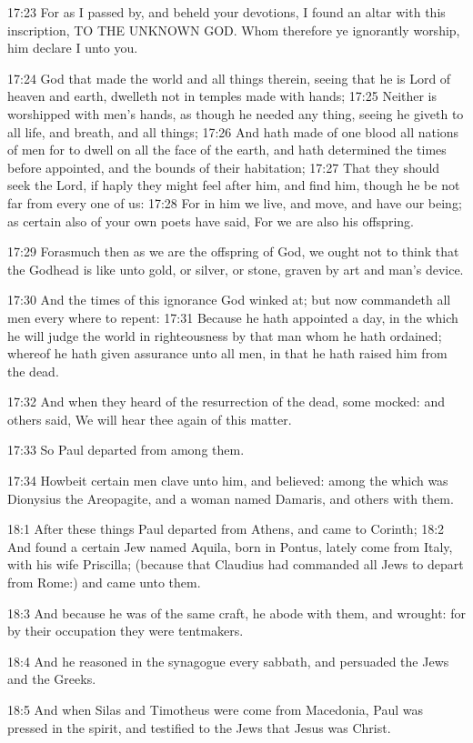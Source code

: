 17:23 For as I passed by, and beheld your devotions, I found an altar
with this inscription, TO THE UNKNOWN GOD. Whom therefore ye
ignorantly worship, him declare I unto you.

17:24 God that made the world and all things therein, seeing that he
is Lord of heaven and earth, dwelleth not in temples made with hands;
17:25 Neither is worshipped with men's hands, as though he needed any
thing, seeing he giveth to all life, and breath, and all things; 17:26
And hath made of one blood all nations of men for to dwell on all the
face of the earth, and hath determined the times before appointed, and
the bounds of their habitation; 17:27 That they should seek the Lord,
if haply they might feel after him, and find him, though he be not far
from every one of us: 17:28 For in him we live, and move, and have our
being; as certain also of your own poets have said, For we are also
his offspring.

17:29 Forasmuch then as we are the offspring of God, we ought not to
think that the Godhead is like unto gold, or silver, or stone, graven
by art and man's device.

17:30 And the times of this ignorance God winked at; but now
commandeth all men every where to repent: 17:31 Because he hath
appointed a day, in the which he will judge the world in righteousness
by that man whom he hath ordained; whereof he hath given assurance
unto all men, in that he hath raised him from the dead.

17:32 And when they heard of the resurrection of the dead, some
mocked: and others said, We will hear thee again of this matter.

17:33 So Paul departed from among them.

17:34 Howbeit certain men clave unto him, and believed: among the
which was Dionysius the Areopagite, and a woman named Damaris, and
others with them.

18:1 After these things Paul departed from Athens, and came to
Corinth; 18:2 And found a certain Jew named Aquila, born in Pontus,
lately come from Italy, with his wife Priscilla; (because that
Claudius had commanded all Jews to depart from Rome:) and came unto
them.

18:3 And because he was of the same craft, he abode with them, and
wrought: for by their occupation they were tentmakers.

18:4 And he reasoned in the synagogue every sabbath, and persuaded the
Jews and the Greeks.

18:5 And when Silas and Timotheus were come from Macedonia, Paul was
pressed in the spirit, and testified to the Jews that Jesus was
Christ.

